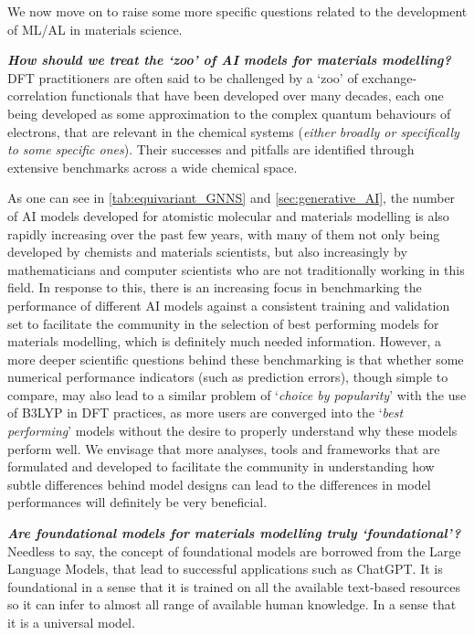 We now move on to raise some more specific questions related to the development of ML/AL in materials science.

\textbf{\emph{How should we treat the `zoo' of AI models for materials modelling? }} DFT practitioners are often said to be challenged by a `zoo'\cite{goerigk2017look} of exchange-correlation functionals that have been developed over many decades, each one being developed as some approximation to the complex quantum behaviours of electrons, that are relevant in the chemical systems (\emph{either broadly or specifically to some specific ones}). Their successes and pitfalls are identified through extensive benchmarks across a wide chemical space.

As one can see in \cref{tab:equivariant_GNNS} and \cref{sec:generative_AI}, the number of AI models developed for atomistic molecular and materials modelling is also rapidly increasing over the past few years, with many of them not only being developed by chemists and materials scientists, but also increasingly by mathematicians and computer scientists who are not traditionally working in this field. In response to this, there is an increasing focus in benchmarking the performance of different AI models against a consistent training and validation set to facilitate the community in the selection of best performing models for materials modelling,\cite{leimeroth2025machine,eastman2026accuracy,yu2024systematic,focassio2025performance,deng2025systematic,riebesell2025framework} which is definitely  much needed information. However, a more deeper scientific questions behind these benchmarking is that whether some numerical performance indicators (such as prediction errors), though simple to compare, may also lead to a similar problem of `\emph{choice by popularity}' with the use of B3LYP\cite{kruse2012standard} in DFT practices, as more users are converged into the `\emph{best performing}' models without the desire to properly understand why these models perform well. We envisage that more analyses, tools and frameworks that are formulated and developed to facilitate the community in understanding how subtle differences behind model designs can lead to the differences in model performances will definitely be very beneficial.

\textbf{\emph{Are foundational models for materials modelling truly `foundational'?}} Needless to say, the concept of foundational models are borrowed from the Large Language Models,\cite{vaswani2017attention} that lead to successful applications such as ChatGPT. It is foundational in a sense that it is trained on all the available text-based resources so it can infer to almost all range of available human knowledge. In a sense that it is a universal model. 

